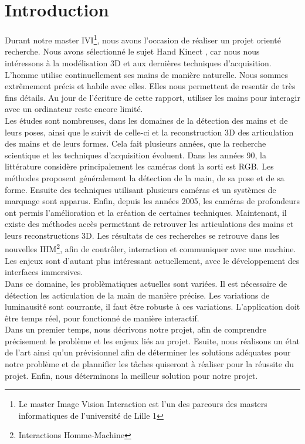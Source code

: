 \chapter*{Introduction}

Durant notre master IVI\footnote{Le master Image Vision Interaction est 
l'un des parcours des masters informatiques de l'université de Lille 1}, 
nous avons l'occasion de réaliser un projet orienté recherche. Nous avons 
sélectionné le sujet \og Hand Kinect \fg, car nous nous intéressons à la 
modélisation 3D et aux dernières techniques d'acquisition. \\

L'homme utilise continuellement ses mains de manière naturelle. Nous 
sommes extrêmement précis et habile avec elles. Elles nous permettent 
de resentir de très fins détails. Au jour de l'écriture de cette rapport,
utiliser les mains pour interagir avec un ordinateur reste encore limité.\\

Les études sont nombreuses, dans les domaines de la détection des mains 
et de leurs poses, ainsi que le suivit de celle-ci et la reconstruction 
3D des articulation des mains et de leurs formes. Cela fait plusieurs années, 
que la recherche scientique et les techniques d'acquisition évoluent. 
Dans les années 90, la littérature considère principalement les caméras 
dont la sorti est RGB. Les méthodes proposent généralement la détection 
de la main, de sa pose et de sa forme. Ensuite des techniques utilisant 
plusieurs caméras et un systèmes de marquage sont apparus. Enfin, depuis 
les années 2005, les caméras de profondeurs ont permis l'amélioration 
et la création de certaines techniques. Maintenant, il existe des méthodes 
accès permettant de retrouver les articulations des mains et leurs 
reconstructions 3D. Les résultats de ces recherches se retrouve dans les 
nouvelles IHM\footnote{Interactions Homme-Machine}, afin de contrôler, 
interaction et communiquer avec une machine. Les enjeux sont d'autant plus 
intéressant actuellement, avec le développement des interfaces 
immersives.\\

Dans ce domaine, les problèmatiques actuelles sont variées. Il est 
nécessaire de détection les acticulation de la main de manière précise. 
Les variations de luminausité sont courrante, il faut être robuste à 
ces variations. L'application doit être temps réel, pour fonctionné de 
manière interactif.\\


Dans un premier temps, nous décrivons notre projet, afin de comprendre 
précisement le problème et les enjeux liés au projet. Esuite, nous réalisons 
un état de l'art ainsi qu'un prévisionnel afin de déterminer les solutions 
adéquates pour notre problème et de plannifier les tâches quiseront à 
réaliser pour la réussite du projet. Enfin, nous déterminons la meilleur 
solution pour notre projet.



